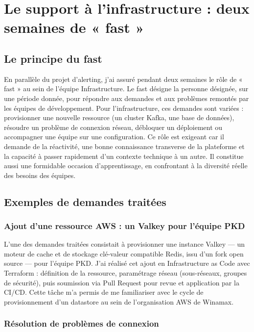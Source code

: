 \chapter{Le support à l'infrastructure : deux semaines de « fast »}

\section{Le principe du fast}

En parallèle du projet d'alerting, j'ai assuré pendant deux semaines le rôle de « fast » au sein de
l'équipe Infrastructure. Le fast désigne la personne désignée, sur une période donnée, pour répondre
aux demandes et aux problèmes remontés par les équipes de développement. Pour l'infrastructure,
ces demandes sont variées : provisionner une nouvelle ressource (un cluster Kafka, une base de
données), résoudre un problème de connexion réseau, débloquer un déploiement ou accompagner
une équipe sur une configuration. Ce rôle est exigeant car il demande de la réactivité, une bonne
connaissance transverse de la plateforme et la capacité à passer rapidement d'un contexte technique
à un autre. Il constitue aussi une formidable occasion d'apprentissage, en confrontant à la diversité
réelle des besoins des équipes.

\section{Exemples de demandes traitées}

\subsection{Ajout d'une ressource AWS : un Valkey pour l'équipe PKD}

L'une des demandes traitées consistait à provisionner une instance Valkey — un moteur de cache et
de stockage clé-valeur compatible Redis, issu d'un fork open source — pour l'équipe PKD. J'ai réalisé
cet ajout en Infrastructure as Code avec Terraform : définition de la ressource, paramétrage réseau
(sous-réseaux, groupes de sécurité), puis soumission via Pull Request pour revue et application par la
CI/CD. Cette tâche m'a permis de me familiariser avec le cycle de provisionnement d'un datastore au
sein de l'organisation AWS de Winamax.

\subsection{Résolution de problèmes de connexion}


